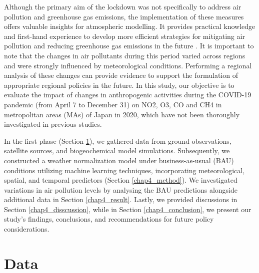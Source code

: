 Although the primary aim of the lockdown was not specifically to address air pollution and greenhouse gas emissions, the implementation of these measures offers valuable insights for atmospheric modelling. It provides practical knowledge and first-hand experience to develop more efficient strategies for mitigating air pollution and reducing greenhouse gas emissions in the future \citep{grange2021covid}. It is important to note that the changes in air pollutants during this period varied across regions and were strongly influenced by meteorological conditions. Performing a regional analysis of these changes can provide evidence to support the formulation of appropriate regional policies in the future. In this study, our objective is to evaluate the impact of changes in anthropogenic activities during the COVID-19 pandemic (from April 7 to December 31) on NO2, O3, CO and CH4 in metropolitan areas (MAs) of Japan in 2020, which have not been thoroughly investigated in previous studies. \par

In the first phase (Section \ref{chap4_data}), we gathered data from ground observations, satellite sources, and biogeochemical model simulations. Subsequently, we constructed a weather normalization model under business-as-usual (BAU) conditions utilizing machine learning techniques, incorporating meteorological, spatial, and temporal predictors (Section \ref{chap4_method}). We investigated variations in air pollution levels by analysing the BAU predictions alongside additional data in Section \ref{chap4_result}. Lastly, we provided discussions in Section \ref{chap4_disscussion}, while in Section \ref{chap4_conclusion}, we present our study's findings, conclusions, and recommendations for future policy considerations.\par

\section{Data} \label{chap4_data}
